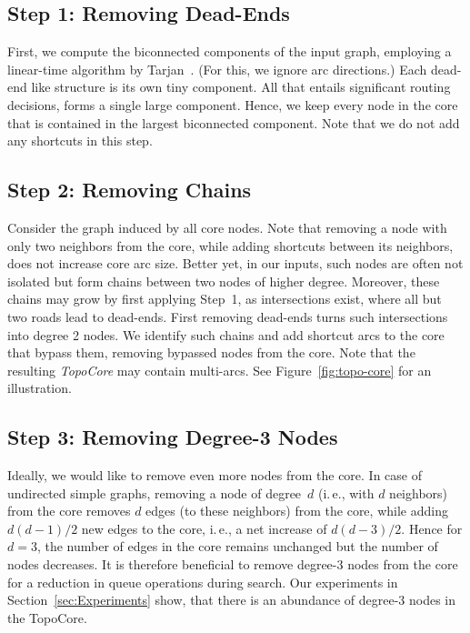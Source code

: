 \documentclass{sig-alternate}
\newcommand{\ie}{i.\,e.\xspace}
\begin{document}
\subsection{Step 1: Removing Dead-Ends}
First, we compute the biconnected components of the input graph, employing a linear-time algorithm by Tarjan~\cite{t-dfslg2-72}. (For this, we ignore arc directions.)
Each dead-end like structure is its own tiny component. 
All that entails significant routing decisions, forms a single large component.
Hence, we keep every node in the core that is contained in the largest biconnected component.
Note that we do not add any shortcuts in this step. 



\subsection{Step 2: Removing Chains}

Consider the graph induced by all core nodes. 
Note that removing a node with only two neighbors from the core, while adding shortcuts between its neighbors, does not increase core arc size.
Better yet, in our inputs, such nodes are often not isolated but form chains between two nodes of higher degree. 
Moreover, these chains may grow by first applying Step~1, as intersections exist, where all but two roads lead to dead-ends. 
First removing dead-ends turns such intersections into degree 2 nodes.
We identify such chains and add shortcut arcs to the core that bypass them, removing bypassed nodes from the core.
Note that the resulting \emph{TopoCore} may contain multi-arcs. See Figure~\ref{fig:topo-core} for an illustration. 


\subsection{Step 3: Removing Degree-3 Nodes}
Ideally, we would like to remove even more nodes from the core.
In case of undirected simple graphs, removing a node of degree~$d$ (\ie, with $d$ neighbors) from the core removes $d$ edges (to these neighbors) from the core, while adding $d(d-1) / 2$ new edges to the core, \ie, a net increase of $d(d-3) / 2$. Hence for $d=3$, the number of edges in the core remains unchanged but the number of
nodes decreases. It is therefore beneficial to remove degree-3 nodes
from the core for a reduction in queue operations during search. Our experiments in Section~\ref{sec:Experiments} show, that there is an abundance of degree-3 nodes in the TopoCore.
\end{document}
